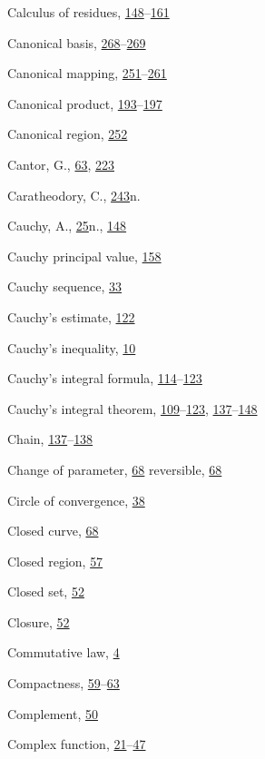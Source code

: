 \begin{theindex}
\item Calculus of residues, \hyperlink{orig-p148}{148}--\hyperlink{orig-p161}{161}
\item Canonical basis, \hyperlink{orig-p268}{268}--\hyperlink{orig-p269}{269}
\item Canonical mapping, \hyperlink{orig-p251}{251}--\hyperlink{orig-p261}{261}
\item Canonical product, \hyperlink{orig-p193}{193}--\hyperlink{orig-p197}{197}
\item Canonical region, \hyperlink{orig-p252}{252}
\item Cantor, G., \hyperlink{orig-p63}{63}, \hyperlink{orig-p223}{223}
\item Caratheodory, C., \hyperlink{orig-p243}{243}n.
\item Cauchy, A., \hyperlink{orig-p25}{25}n., \hyperlink{orig-p148}{148}
\item Cauchy principal value, \hyperlink{orig-p158}{158}
\item Cauchy sequence, \hyperlink{orig-p33}{33}
\item Cauchy's estimate, \hyperlink{orig-p122}{122}
\item Cauchy's inequality, \hyperlink{orig-p10}{10}
\item Cauchy's integral formula, \hyperlink{orig-p114}{114}--\hyperlink{orig-p123}{123}
\item Cauchy's integral theorem, \hyperlink{orig-p109}{109}--\hyperlink{orig-p123}{123}, \hyperlink{orig-p137}{137}--\hyperlink{orig-p148}{148}
\item Chain, \hyperlink{orig-p137}{137}--\hyperlink{orig-p138}{138}
\item Change of parameter, \hyperlink{orig-p68}{68}
\subitem reversible, \hyperlink{orig-p68}{68}
\item Circle of convergence, \hyperlink{orig-p38}{38}
\item Closed curve, \hyperlink{orig-p68}{68}
\item Closed region, \hyperlink{orig-p57}{57}
\item Closed set, \hyperlink{orig-p52}{52}
\item Closure, \hyperlink{orig-p52}{52}
\item Commutative law, \hyperlink{orig-p4}{4}
\item Compactness, \hyperlink{orig-p59}{59}--\hyperlink{orig-p63}{63}
\item Complement, \hyperlink{orig-p50}{50}
\item Complex function, \hyperlink{orig-p21}{21}--\hyperlink{orig-p47}{47}

\end{theindex}
